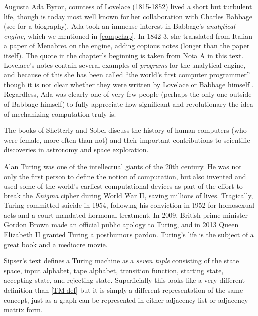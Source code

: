 Augusta Ada Byron, countess of Lovelace (1815-1852) lived a short but
turbulent life, though is today most well known for her collaboration
with Charles Babbage (see \cite{stein1987ada} for a biography). Ada took
an immense interest in Babbage's \emph{analytical engine}, which we
mentioned in \cref{compchap}. In 1842-3, she translated from Italian a
paper of Menabrea on the engine, adding copious notes (longer than the
paper itself). The quote in the chapter's beginning is taken from Nota A
in this text. Lovelace's notes contain several examples of
\emph{programs} for the analytical engine, and because of this she has
been called ``the world's first computer programmer'' though it is not
clear whether they were written by Lovelace or Babbage himself
\cite{holt2001ada}. Regardless, Ada was clearly one of very few people
(perhaps the only one outside of Babbage himself) to fully appreciate
how significant and revolutionary the idea of mechanizing computation
truly is.

The books of Shetterly \cite{shetterly2016hidden} and Sobel
\cite{sobel2017the} discuss the history of human computers (who were
female, more often than not) and their important contributions to
scientific discoveries in astronomy and space exploration.

Alan Turing was one of the intellectual giants of the 20th century. He
was not only the first person to define the notion of computation, but
also invented and used some of the world's earliest computational
devices as part of the effort to break the \emph{Enigma} cipher during
World War II, saving \href{https://goo.gl/KY1bJN}{millions of lives}.
Tragically, Turing committed suicide in 1954, following his conviction
in 1952 for homosexual acts and a court-mandated hormonal treatment. In
2009, British prime minister Gordon Brown made an official public
apology to Turing, and in 2013 Queen Elizabeth II granted Turing a
posthumous pardon. Turing's life is the subject of a
\href{https://goo.gl/3GdFdp}{great book} and a
\href{https://goo.gl/EtQvSu}{mediocre movie}.

Sipser's text \cite{SipserBook} defines a Turing machine as a
\emph{seven tuple} consisting of the state space, input alphabet, tape
alphabet, transition function, starting state, accepting state, and
rejecting state. Superficially this looks like a very different
definition than \cref{TM-def} but it is simply a different
representation of the same concept, just as a graph can be represented
in either adjacency list or adjacency matrix form.

